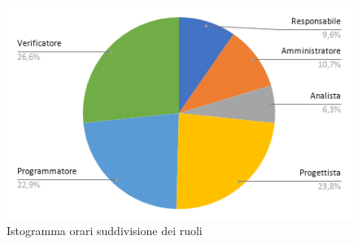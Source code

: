         \begin{figure}[!h]
            \caption{Istogramma orari suddivisione dei ruoli}
            \vspace{5px}
            \includegraphics[scale=0.5]{../../../Images/Diagrammi/Diagramma a torta/ore rendicontate.png}
            \centering
        \end{figure}